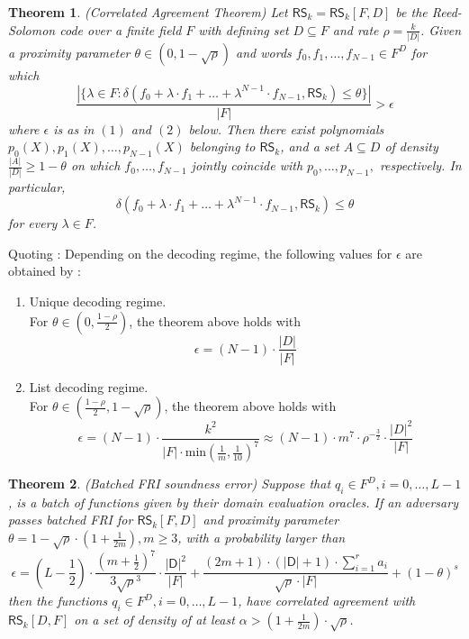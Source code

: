 \documentclass[10pt,letterpaper,titlepage]{article}
\newtheorem{theorem}{Theorem}
\theoremstyle{definition}
\begin{document}
\begin{appendices}
\begin{theorem}
  (Correlated Agreement Theorem) Let $\mathsf{RS}_k=\mathsf{RS}_k[F,D]$ be the Reed-Solomon code over a finite field $F$ with defining set $D\subseteq F$ and rate $\rho=\frac{k}{|D|}$.
  Given a proximity parameter $\theta\in(0,1-\sqrt{\rho})$ and words $f_0,f_1,\ldots,f_{N-1}\in F^D$ for which
  \[
    \frac{|\{\lambda\in F:\delta(f_0+\lambda\cdot f_1 +\ldots+\lambda^{N-1}\cdot f_{N-1},\mathsf{RS}_k)\leq\theta\}|}{|F|}>\epsilon
  \]
  where $\epsilon$ is as in $(1)$ and $(2)$ below.
  Then there exist polynomials $p_0(X),p_1(X),\ldots,p_{N-1}(X)$ belonging to $\mathsf{RS}_k$, and a set $A\subseteq D$ of density $\frac{|A|}{|D|}\geq 1-\theta$ on which $f_0,\ldots,f_{N-1}$ jointly coincide with $p_0,\ldots,p_{N-1},$ respectively. In particular,
  \[
    \delta(f_0+\lambda\cdot f_1 + \ldots + \lambda^{N-1}\cdot f_{N-1},\mathsf{RS}_k)\leq\theta
  \]
  for every $\lambda\in F$.
\end{theorem}
\noindent
Quoting \cite{FRIsummary}:
Depending on the decoding regime, the following values for $\epsilon$ are obtained by \cite{proxGaps}:
\begin{enumerate}
  \item Unique decoding regime. \\
  For $\theta\in\left(0,\frac{1-\rho}{2}\right)$, the theorem above holds with
  \[\epsilon = (N-1)\cdot\frac{|D|}{|F|}\]
  \item List decoding regime. \\
  For $\theta\in\left(\frac{1-\rho}{2},1-\sqrt{\rho}\right)$, the theorem above holds with
  \[
    \epsilon=
    (N-1)\cdot
    \frac{k^2}{|F|\cdot\text{min}\left(\frac{1}{m},\frac{1}{10}\right)^7}\approx
    (N-1)\cdot
    m^7\cdot
    \rho^{-\frac{3}{2}}\cdot
    \frac{|D|^2}{|F|}
  \]
\end{enumerate}
\begin{theorem}
  (Batched FRI soundness error) Suppose that $q_i\in F^D, i=0,\ldots,L-1$, is a batch of functions given by their domain evaluation oracles.
  If an adversary passes batched FRI for $\mathsf{RS}_k[F,D]$ and proximity parameter $\theta=1-\sqrt{\rho}\cdot(1+\frac{1}{2m}),m\geq3$, with a probability larger than
  \[
    \epsilon=
    (L-\frac{1}{2})\cdot\frac{(m+\frac{1}{2})^7}{3\sqrt{\rho}^3}\cdot\frac{|\mathsf{D}|^2}{|F|}
    +
    \frac{(2m+1)\cdot(|\mathsf{D}|+1)\cdot\sum^r_{i=1}a_i}{\sqrt{\rho}\cdot|F|}
    +
    (1-\theta)^s
  \]
  then the functions $q_i\in F^D, i=0,\ldots,L-1$, have correlated agreement with $\mathsf{RS}_k[D,F]$ on a set of density of at least $\alpha>(1+\frac{1}{2m})\cdot\sqrt{\rho}$.

\end{theorem}
\end{appendices}
\end{document}
